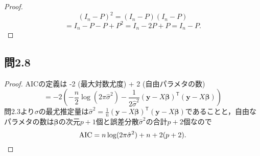 \documentclass[pdflatex,ja=standard]{bxjsarticle}
\begin{document}
\begin{proof}
\begin{equation}
(I_n - P)^2 = (I_n - P) (I_n - P)
\end{equation}
\begin{equation}
= I_n - P - P + P^2 = I_n - 2P + P = I_n - P.
\end{equation}
\end{proof}

\subsection{問2.8}
\begin{proof}
AICの定義は -2 (最大対数尤度) + 2 (自由パラメタの数)
\begin{equation}
= -2 \left( - \frac{n}{2} \log (2 \pi \hat{\sigma}^2) - \frac{1}{2 \hat{\sigma}^2} (\bm{y} - X \bm{\beta})^{\mathsf{T}} (\bm{y} - X \bm{\beta}) \right)
\end{equation}
問2.3より$\sigma$の最尤推定量は$\hat{\sigma}^2 = \frac{1}{n} (\bm{y} - X \bm{\beta})^{\mathsf{T}} (\bm{y} - X \bm{\beta})$であることと，自由なパラメタの数は$\bm{\beta}$の次元$p+1$個と誤差分散$\hat{\sigma}^2$の合計$p+2$個なので
\begin{equation}
{\rm AIC} = n \log (2 \pi \hat{\sigma}^2) + n + 2(p + 2).
\end{equation}
\end{proof}
\end{document}
